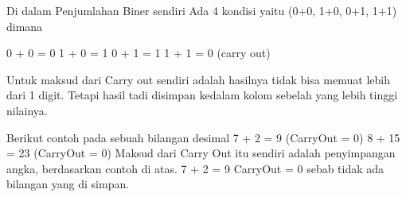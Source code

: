 Di dalam Penjumlahan Biner sendiri Ada 4 kondisi yaitu
(0+0, 1+0, 0+1, 1+1) dimana

0 + 0 = 0
1 + 0 = 1
0 + 1 = 1
1 + 1 = 0 (carry out) 

Untuk maksud dari Carry out sendiri adalah hasilnya tidak bisa memuat lebih dari 1 digit. Tetapi  hasil tadi disimpan kedalam kolom sebelah yang lebih tinggi nilainya.

Berikut contoh pada sebuah bilangan desimal
7 + 2 = 9 (CarryOut = 0)
8 + 15 = 23 (CarryOut = 0)
Maksud dari Carry Out itu sendiri adalah penyimpangan angka, berdasarkan contoh di atas. 7 + 2 = 9 CarryOut = 0 sebab tidak ada bilangan yang di simpan. 
